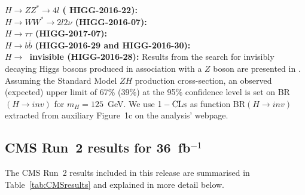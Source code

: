 {\bf\boldmath $H\to ZZ^*\to 4l$ ( HIGG-2016-22):} \\


{\bf\boldmath $H\to WW^*\to 2l2\nu$ (HIGG-2016-07):} \\

{\bf\boldmath $H\to \tau\tau$ (HIGG-2017-07):} \\

{\bf\boldmath $H\to b\bar b$ (HIGG-2016-29 and HIGG-2016-30):}\\



{\bf\boldmath $H\to$~invisible (HIGG-2016-28):}
Results from the search for invisibly decaying Higgs bosons produced in association with a $Z$ boson are presented in \cite{Aaboud:2017bja}. Assuming the Standard Model $ZH$ production cross-section, an observed (expected) upper limit of 67\% (39\%) at the 95\% confidence level is set on BR$(H\to inv)$ for $m_H= 125$~GeV. We use $1-{\rm CLs}$ as function BR$(H\to inv)$ extracted from auxiliary Figure~1c on the analysis' webpage. 


\clearpage
\subsection{CMS Run~2 results for 36~fb$^{-1}$}

The CMS Run~2 results included in this release are summarised in Table~\ref{tab:CMSresults} and explained in more detail below.

